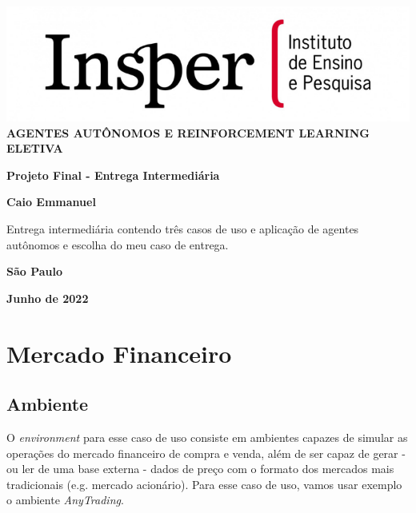 \documentclass[12pt]{article}
\begin{document}
\begin{titlepage}
    \vfill
	\begin{center}
    \includegraphics[scale=1.0]{src/img/insper-cover.png}\\
	\textbf{AGENTES AUTÔNOMOS E REINFORCEMENT LEARNING \\ [0.05cm]ELETIVA}

	\vspace{0.6cm}
	\vspace{4cm}
	{\huge \textbf{Projeto Final - Entrega Intermediária}}\vspace{8mm}
	
	{\large \textbf{Caio Emmanuel}}\\[2.5cm]
	
		\hspace{.45\textwidth} %
	   \begin{minipage}{.5\textwidth}
	   Entrega intermediária contendo três casos de uso e aplicação de agentes autônomos e escolha do meu caso de entrega.\\[0.1cm]
	  \end{minipage}
	  \vfill
	
	\textbf{São Paulo}
	
	\textbf{Junho de 2022}
	\end{center}
	
\end{titlepage}
\pagebreak
\tableofcontents
\pagebreak

\section{Mercado Financeiro}

\subsection{Ambiente}

O \textit{environment} para esse caso de uso consiste em ambientes capazes de simular as operações do mercado financeiro de compra e venda, além de ser capaz de gerar - ou ler de uma base externa - dados de preço com o formato dos mercados mais tradicionais (e.g. mercado acionário). Para esse caso de uso, vamos usar exemplo o ambiente \textit{AnyTrading}\cite{anytrading}.
\end{document}
